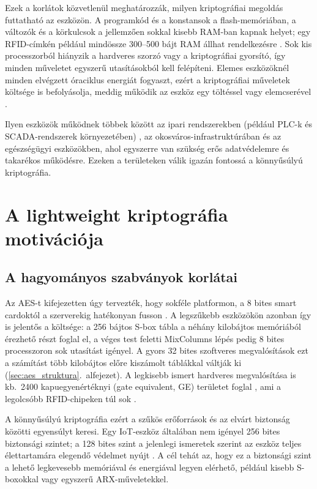 \documentclass[a4paper,12pt]{report}
\theoremstyle{definition}
\theoremstyle{remark}
\begin{document}
Ezek a korlátok közvetlenül meghatározzák, milyen kriptográfiai megoldás futtatható az eszközön. A programkód és a konstansok a flash-memóriában, a változók és a körkulcsok a jellemzően sokkal kisebb RAM-ban kapnak helyet; egy RFID-címkén például mindössze 300--500 bájt RAM állhat rendelkezésre \cite{Hatzivasilis2018}. Sok kis processzorból hiányzik a hardveres szorzó vagy a kriptográfiai gyorsító, így minden műveletet egyszerű utasításokból kell felépíteni. Elemes eszközöknél minden elvégzett óraciklus energiát fogyaszt, ezért a kriptográfiai műveletek költsége is befolyásolja, meddig működik az eszköz egy töltéssel vagy elemcserével \cite{NISTIR8114}.

Ilyen eszközök működnek többek között az ipari rendszerekben (például PLC-k és SCADA-rendszerek környezetében) \cite{Sadeghi2015}, az okosváros-infrastruktúrában és az egészségügyi eszközökben, ahol egyszerre van szükség erős adatvédelemre és takarékos működésre. Ezeken a területeken válik igazán fontossá a könnyűsúlyú kriptográfia.

\section{A lightweight kriptográfia motivációja}\label{sec:lwc_motivacio}

\subsection{A hagyományos szabványok korlátai}

Az AES-t kifejezetten úgy tervezték, hogy sokféle platformon, a 8 bites smart cardoktól a szerverekig hatékonyan fusson \cite{DaemenRijmen2002}. A legszűkebb eszközökön azonban így is jelentős a költsége: a 256 bájtos S-box tábla a néhány kilobájtos memóriából érezhető részt foglal el, a véges test feletti MixColumns lépés pedig 8 bites processzoron sok utasítást igényel. A gyors 32 bites szoftveres megvalósítások ezt a számítást több kilobájtos előre kiszámolt táblákkal váltják ki (\ref{sec:aes_struktura}.~alfejezet). A legkisebb ismert hardveres megvalósítása is kb.\ 2400 kapuegyenértéknyi (gate equivalent, GE) területet foglal \cite{Moradi2011}, ami a legolcsóbb RFID-chipeken túl sok \cite{NISTIR8114}.

A könnyűsúlyú kriptográfia ezért a szűkös erőforrások és az elvárt biztonság közötti egyensúlyt keresi. Egy IoT-eszköz általában nem igényel 256 bites biztonsági szintet; a 128 bites szint a jelenlegi ismeretek szerint az eszköz teljes élettartamára elegendő védelmet nyújt \cite{Biryukov2017}. A cél tehát az, hogy ez a biztonsági szint a lehető legkevesebb memóriával és energiával legyen elérhető, például kisebb S-boxokkal vagy egyszerű ARX-műveletekkel.
\end{document}

